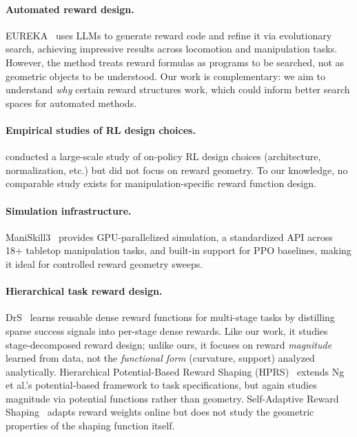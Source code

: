 \documentclass{article}
\begin{document}
\paragraph{Automated reward design.}
EUREKA~\citep{ma2024eureka} uses LLMs to generate reward code and refine it via
evolutionary search, achieving impressive results across locomotion and manipulation
tasks. However, the method treats reward formulas as programs to be searched, not as
geometric objects to be understood. Our work is complementary: we aim to understand
\emph{why} certain reward structures work, which could inform better search spaces for
automated methods.

\paragraph{Empirical studies of RL design choices.}
\citet{andrychowicz2020matters} conducted a large-scale study of on-policy RL design
choices (architecture, normalization, etc.) but did not focus on reward geometry.
To our knowledge, no comparable study exists for manipulation-specific reward function
design.

\paragraph{Simulation infrastructure.}
ManiSkill3~\citep{maniskill3} provides GPU-parallelized simulation, a standardized
API across 18+ tabletop manipulation tasks, and built-in support for PPO baselines,
making it ideal for controlled reward geometry sweeps.

\paragraph{Hierarchical task reward design.}
DrS~\citep{zhuang2024drs} learns reusable dense reward functions for multi-stage tasks
by distilling sparse success signals into per-stage dense rewards. Like our work, it
studies stage-decomposed reward design; unlike ours, it focuses on reward
\emph{magnitude} learned from data, not the \emph{functional form} (curvature, support)
analyzed analytically. Hierarchical Potential-Based Reward Shaping (HPRS)~\citep{demir2024hprs}
extends Ng et al.'s potential-based framework to task specifications, but again studies
magnitude via potential functions rather than geometry.
Self-Adaptive Reward Shaping~\citep{selfadaptive2024} adapts reward weights online
but does not study the geometric properties of the shaping function itself.
\end{document}
